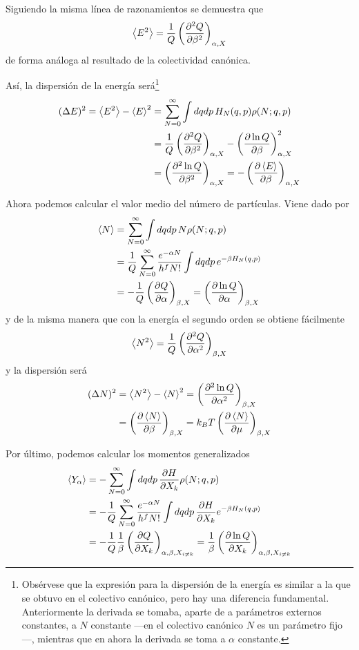 Siguiendo la misma línea de razonamientos se demuestra que
$$\expval{E^2} = \frac{1}{Q} \left( \pdv[2]{Q}{\beta} \right)_{\alpha, X}$$
de forma análoga al resultado de la colectividad canónica.

Así, la dispersión de la energía será\footnote{Obsérvese que la expresión para la dispersión de la energía es similar a la que se obtuvo en el colectivo canónico, pero hay una diferencia fundamental.
Anteriormente la derivada se tomaba, aparte de a parámetros externos constantes, a $N$ constante ---en el colectivo canónico $N$ es un parámetro fijo---, mientras que en ahora la derivada se toma a $\alpha$ constante.}
\begin{align}
	(\Delta E)^2 = \expval{E^2} - \expval{E}^2 &= \sum_{N = 0}^\infty \int dqdp \, H_N(q,p) \rho(N; q,p) \nonumber\\
		&= \frac{1}{Q} \left( \pdv[2]{Q}{\beta} \right)_{\alpha, X} -  \left( \pdv{\ln Q}{\beta} \right)_{\alpha, X}^2 \\
		&= \left( \pdv[2]{\ln Q}{\beta} \right)_{\alpha, X} = - \left( \pdv{\expval{E}}{\beta} \right)_{\alpha, X} \nonumber
\end{align}

Ahora podemos calcular el valor medio del número de partículas. Viene dado por
\begin{align}
	\expval{N} &= \sum_{N = 0}^\infty \int dqdp \, N \rho(N; q,p) \nonumber \\
								&= \frac{1}{Q} \sum_{N = 0}^\infty \frac{e^{-\alpha N}}{h^f N!}\int dqdp \, e^{-\beta H_N(q,p)} \\
								&= - \frac{1}{Q} \left( \pdv{Q}{\alpha} \right)_{\beta, X} = \left( \pdv{\ln Q}{\alpha} \right)_{\beta, X} \nonumber
\end{align}
y de la misma manera que con la energía el segundo orden se obtiene fácilmente
\begin{equation}
	\expval{N^2} = \frac{1}{Q} \left( \pdv[2]{Q}{\alpha} \right)_{\beta, X}
\end{equation}
y la dispersión será
\begin{align}
(\Delta N)^2 &= \expval{N^2} - \expval{N}^2 =  \left( \pdv[2]{\ln Q}{\alpha} \right)_{\beta, X} \nonumber\\ 
			&= \left( \pdv{\expval{N}}{\beta} \right)_{\beta, X} = k_B T \left( \pdv{\expval{N}}{\mu} \right)_{\beta, X}
\end{align}

Por último, podemos calcular los momentos generalizados
\begin{align}
\expval{Y_\alpha} &= - \sum_{N = 0}^\infty \int dqdp \, \pdv{H}{X_k} \rho(N; q,p) \nonumber \\
					&= - \frac{1}{Q} \sum_{N = 0}^\infty \frac{e^{-\alpha N}}{h^f N!}\int dqdp \, \pdv{H}{X_k} e^{-\beta H_N(q,p)} \\
					&= - \frac{1}{Q} \frac{1}{\beta} \left( \pdv{Q}{X_k} \right)_{\alpha, \beta, X_{i \neq k}} = \frac{1}{\beta} \left( \pdv{\ln Q}{X_k} \right)_{\alpha, \beta, X_{i \neq k}} \nonumber
\end{align}

